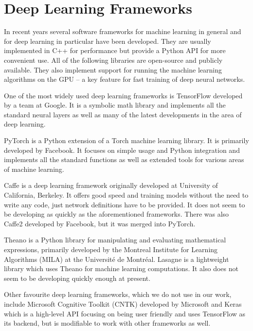 \section{Deep Learning Frameworks}
In recent years several software frameworks for machine learning in general and for deep learning in particular have been developed. They are usually implemented in C++ for performance but provide a Python API for more convenient use. All of the following libraries are open-source and publicly available. They also implement support for running the machine learning algorithms on the GPU -- a key feature for fast training of deep neural networks. \par
One of the most widely used deep learning frameworks is TensorFlow \cite{martin_abadi_tensorflow:_2015} developed by a team at Google. It is a symbolic math library and implements all the standard neural layers as well as many of the latest developments in the area of deep learning.  \par
PyTorch \cite{paszke_automatic_2017} is a Python extension of a Torch machine learning library. It is primarily developed by Facebook. It focuses on simple usage and Python integration and implements all the standard functions as well as extended tools for various areas of machine learning. \par
Caffe \cite{jia_caffe:_2014} is a deep learning framework originally developed at University of California, Berkeley. It offers good speed and training models without the need to write any code, just network definitions have to be provided. It does not seem to be developing as quickly as the aforementioned frameworks. There was also Caffe2 developed by Facebook, but it was merged into PyTorch. \par
Theano \cite{theano_development_team_theano:_2016} is a Python library for manipulating and evaluating mathematical expressions, primarily developed by the Montreal Institute for Learning Algorithms (MILA) at the Université de Montréal. Lasagne \cite{dieleman_lasagne:_2015} is a lightweight library which uses Theano for machine learning computations. It also does not seem to be developing quickly enough at present. \par
Other favourite deep learning frameworks, which we do not use in our work, include Microsoft Cognitive Toolkit (CNTK) \cite{seide_cntk:_2016} developed by Microsoft and Keras \cite{chollet_keras_2015} which is a high-level API focusing on being user friendly and uses TensorFlow as its backend, but is modifiable to work with other frameworks as well.

